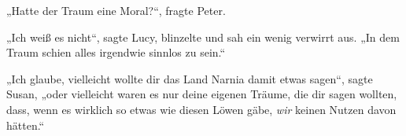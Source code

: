 „Hatte der Traum eine Moral?“, fragte Peter.

„Ich weiß es nicht“, sagte Lucy, blinzelte und sah ein wenig verwirrt aus. „In dem Traum schien alles irgendwie sinnlos zu sein.“

„Ich glaube, vielleicht wollte dir das Land Narnia damit etwas sagen“, sagte Susan, „oder vielleicht waren es nur deine eigenen Träume, die dir sagen wollten, dass, wenn es wirklich so etwas wie diesen Löwen gäbe, \emph{wir} keinen Nutzen davon hätten.“



